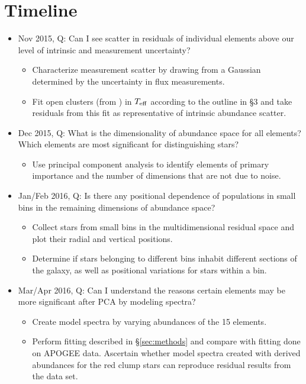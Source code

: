 \documentclass[preprint]{aastex}
\begin{document}
\section{Timeline}
\label{sec:timeline}

\begin{itemize}
\item Nov 2015, Q: Can I see scatter in residuals of individual elements above our level of intrinsic and measurement uncertainty?
\begin{itemize}
\item Characterize measurement scatter by drawing from a Gaussian determined by the uncertainty in flux measurements.
\item Fit open clusters (from \citealt{meszaros2015}) in $T_{\rm eff}$ according to the outline in \S3 and take residuals from this fit as representative of intrinsic abundance scatter.
\end{itemize}
\item Dec 2015, Q: What is the dimensionality of abundance space for all elements? Which elements are most significant for distinguishing stars?
\begin{itemize}
\item Use principal component analysis to identify elements of primary importance and the number of dimensions that are not due to noise.
\end{itemize}
\item Jan/Feb 2016, Q: Is there any positional dependence of populations in small bins in the remaining dimensions of abundance space?
\begin{itemize}
\item Collect stars from small bins in the multidimensional residual space and plot their radial and vertical positions.
\item Determine if stars belonging to different bins inhabit different sections of the galaxy, as well as positional variations for stars within a bin.
\end{itemize}
\item Mar/Apr 2016, Q: Can I understand the reasons certain elements may be more significant after PCA by modeling spectra?
\begin{itemize}
\item Create model spectra by varying abundances of the 15 elements.
\item Perform fitting described in \S\ref{sec:methods} and compare with fitting done on APOGEE data. Ascertain whether model spectra created with derived abundances for the red clump stars can reproduce residual results from the data set.
\end{itemize}
\end{itemize}
\end{document}
